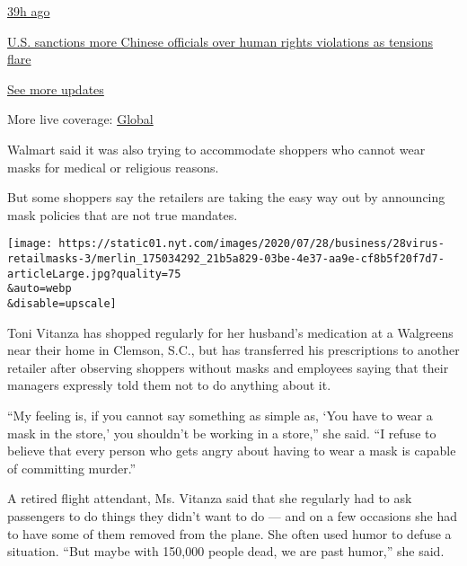 \href{https://www.nytimes.com/live/2020/07/31/business/stock-market-today-coronavirus?action=click\&pgtype=Article\&state=default\&region=MAIN_CONTENT_1\&context=storylines_live_updates\#us-sanctions-more-chinese-officials-over-human-rights-violations-as-tensions-flare}{39h
ago}

\href{https://www.nytimes.com/live/2020/07/31/business/stock-market-today-coronavirus?action=click\&pgtype=Article\&state=default\&region=MAIN_CONTENT_1\&context=storylines_live_updates\#us-sanctions-more-chinese-officials-over-human-rights-violations-as-tensions-flare}{U.S.
sanctions more Chinese officials over human rights violations as
tensions flare}

\href{https://www.nytimes.com/live/2020/07/31/business/stock-market-today-coronavirus?action=click\&pgtype=Article\&state=default\&region=MAIN_CONTENT_1\&context=storylines_live_updates}{See
more updates}

More live coverage:
\href{https://www.nytimes.com/2020/08/01/world/coronavirus-covid-19.html?action=click\&pgtype=Article\&state=default\&region=MAIN_CONTENT_1\&context=storylines_live_updates}{Global}

Walmart said it was also trying to accommodate shoppers who cannot wear
masks for medical or religious reasons.

But some shoppers say the retailers are taking the easy way out by
announcing mask policies that are not true mandates.

\texttt{[image: https://static01.nyt.com/images/2020/07/28/business/28virus-retailmasks-3/merlin\_175034292\_21b5a829-03be-4e37-aa9e-cf8b5f20f7d7-articleLarge.jpg?quality=75\\\&auto=webp\\\&disable=upscale]}

Toni Vitanza has shopped regularly for her husband's medication at a
Walgreens near their home in Clemson, S.C., but has transferred his
prescriptions to another retailer after observing shoppers without masks
and employees saying that their managers expressly told them not to do
anything about it.

``My feeling is, if you cannot say something as simple as, `You have to
wear a mask in the store,' you shouldn't be working in a store,'' she
said. ``I refuse to believe that every person who gets angry about
having to wear a mask is capable of committing murder.''

A retired flight attendant, Ms. Vitanza said that she regularly had to
ask passengers to do things they didn't want to do --- and on a few
occasions she had to have some of them removed from the plane. She often
used humor to defuse a situation. ``But maybe with 150,000 people dead,
we are past humor,'' she said.

